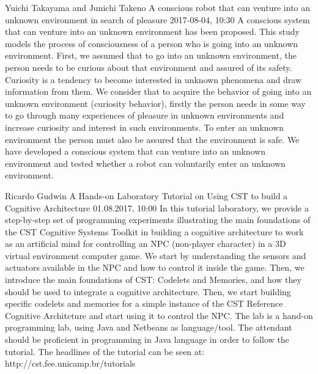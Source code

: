 \documentclass[10pt,fleqn,openany]{book} %
\begin{document}
\begin{enumerate}
	
	\paperabstract
	{Yuichi Takayama and Junichi Takeno}
	{A conscious robot that can venture into an unknown environment in search of pleasure}
	{2017-08-04, 10:30}
	{A conscious system that can venture into an unknown environment has been proposed. This study models the process of consciousness of a person who is going into an unknown environment. First, we assumed that to go into an unknown environment, the person needs to be curious about that environment and assured of its safety. Curiosity is a tendency to become interested in unknown phenomena and draw information from them. We consider that to acquire the behavior of going into an unknown environment (curiosity behavior), firstly the person needs in some way to go through many experiences of pleasure in unknown environments and increase curiosity and interest in such environments. To enter an unknown environment the person must also be assured that the environment is safe. We have developed a conscious system that can venture into an unknown environment and tested whether a robot can voluntarily enter an unknown environment.}
	
	
	\paperabstract
	{Ricardo Gudwin}
	{A Hands-on Laboratory Tutorial on Using CST to build a Cognitive Architecture}
	{01.08.2017, 10:00}
	{In this tutorial laboratory, we provide a step-by-step set of programming experiments illustrating the main foundations of the CST Cognitive Systems Toolkit in building a cognitive architecture to work as an artificial mind for controlling an NPC (non-player character) in a 3D virtual environment computer game. We start by understanding the sensors and actuators available in the NPC and how to control it inside the game. Then, we introduce the main foundations of CST: Codelets and Memories, and how they should be used to integrate a cognitive architecture. Then, we start building specific codelets and memories for a simple instance of the CST Reference Cognitive Architcture and start using it to control the NPC. The lab is a hand-on programming lab, using Java and Netbeans as language/tool. The attendant should be proficient in programming in Java language in order to follow the tutorial.    The headlines of the tutorial can be seen at: http://cst.fee.unicamp.br/tutorials}
	

\end{enumerate}
\end{document}

